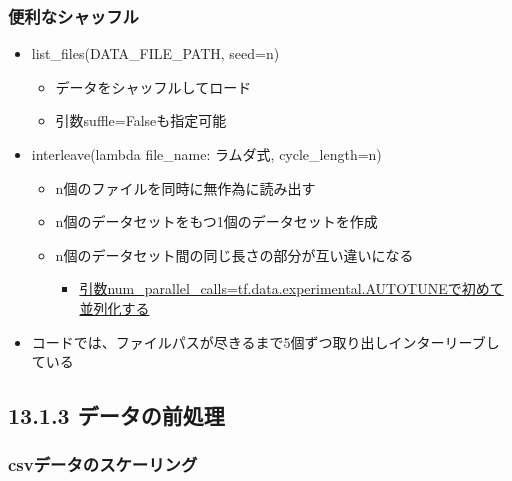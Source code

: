 \hypertarget{ux4fbfux5229ux306aux30b7ux30e3ux30c3ux30d5ux30eb}{%
\subsubsection{便利なシャッフル}\label{ux4fbfux5229ux306aux30b7ux30e3ux30c3ux30d5ux30eb}}

\begin{itemize}
\tightlist
\item
  list\_files(DATA\_FILE\_PATH, seed=n)

  \begin{itemize}
  \tightlist
  \item
    データをシャッフルしてロード
  \item
    引数suffle=Falseも指定可能
  \end{itemize}
\item
  interleave(lambda file\_name: ラムダ式, cycle\_length=n)

  \begin{itemize}
  \tightlist
  \item
    n個のファイルを同時に無作為に読み出す
  \item
    n個のデータセットをもつ1個のデータセットを作成
  \item
    n個のデータセット間の同じ長さの部分が互い違いになる

    \begin{itemize}
    \tightlist
    \item
      \href{https://tensorflow.classcat.com/2019/03/23/tf20-alpha-guide-data-performance/}{引数num\_parallel\_calls=tf.data.experimental.AUTOTUNEで初めて並列化する}
    \end{itemize}
  \end{itemize}
\item
  コードでは、ファイルパスが尽きるまで5個ずつ取り出しインターリーブしている
\end{itemize}

\hypertarget{ux30c7ux30fcux30bfux306eux524dux51e6ux7406}{%
\subsection{13.1.3
データの前処理}\label{ux30c7ux30fcux30bfux306eux524dux51e6ux7406}}

\hypertarget{csvux30c7ux30fcux30bfux306eux30b9ux30b1ux30fcux30eaux30f3ux30b0}{%
\subsubsection{csvデータのスケーリング}\label{csvux30c7ux30fcux30bfux306eux30b9ux30b1ux30fcux30eaux30f3ux30b0}}

